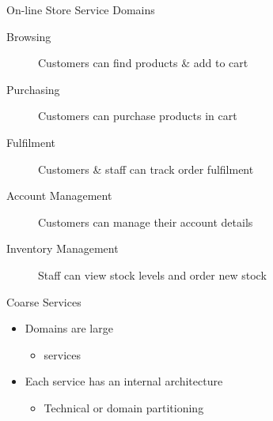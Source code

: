 \documentclass{slide}
\begin{document}
\begin{frame}{On-line Store Service Domains}
    \vspace{1mm}
    {\LARGE
    \begin{description}
        \item[Browsing] Customers can find products \& add to cart
        \item[Purchasing] Customers can purchase products in cart
        \item[Fulfilment] Customers \& staff can track order fulfilment
        \item[Account Management] Customers can manage their account details
        \item[Inventory Management] Staff can view stock levels and order new stock
    \end{description}
    }
\end{frame}




\begin{frame}{Coarse Services}
    \vspace{1mm}
    {\LARGE
    \begin{itemize}
        \item Domains are large
        \begin{itemize}
            \Large\item {} services
        \end{itemize}
        \vspace{2mm}
        \item Each service has an internal architecture
        \begin{itemize}
            \Large\item Technical or domain partitioning
        \end{itemize}
    \end{itemize}
    }
\end{frame}
\end{document}

